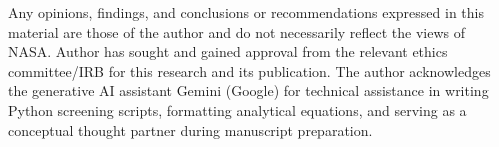 \documentclass[aps,prmaterials,reprint,superscriptaddress,amsmath,amssymb,floatfix]{revtex4-2}
\begin{document}
\begin{acknowledgments}
Any opinions, findings, and conclusions or recommendations expressed in this material are those of the author and do not necessarily reflect the views of NASA. Author has sought and gained approval from the relevant ethics committee/IRB for this research and its publication. The author acknowledges the generative AI assistant Gemini (Google) for technical assistance in writing Python screening scripts, formatting analytical equations, and serving as a conceptual thought partner during manuscript preparation.

\end{acknowledgments}



\end{document}
